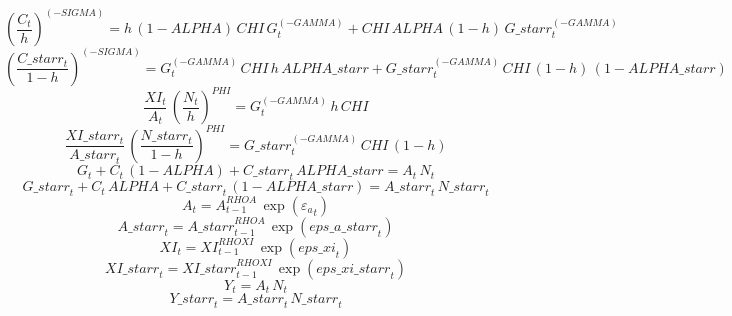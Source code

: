 \begin{dmath}
\left(\frac{{C}_{t}}{{h}}\right)^{\left(-{SIGMA}\right)}={h}\, \left(1-{ALPHA}\right)\, {CHI}\, {G}_{t}^{\left(-{GAMMA}\right)}+{CHI}\, {ALPHA}\, \left(1-{h}\right)\, {G\_starr}_{t}^{\left(-{GAMMA}\right)}
\end{dmath}
\begin{dmath}
\left(\frac{{C\_starr}_{t}}{1-{h}}\right)^{\left(-{SIGMA}\right)}={G}_{t}^{\left(-{GAMMA}\right)}\, {CHI}\, {h}\, {ALPHA\_starr}+{G\_starr}_{t}^{\left(-{GAMMA}\right)}\, {CHI}\, \left(1-{h}\right)\, \left(1-{ALPHA\_starr}\right)
\end{dmath}
\begin{dmath}
\frac{{XI}_{t}}{{A}_{t}}\, \left(\frac{{N}_{t}}{{h}}\right)^{{PHI}}={G}_{t}^{\left(-{GAMMA}\right)}\, {h}\, {CHI}
\end{dmath}
\begin{dmath}
\frac{{XI\_starr}_{t}}{{A\_starr}_{t}}\, \left(\frac{{N\_starr}_{t}}{1-{h}}\right)^{{PHI}}={G\_starr}_{t}^{\left(-{GAMMA}\right)}\, {CHI}\, \left(1-{h}\right)
\end{dmath}
\begin{dmath}
{G}_{t}+{C}_{t}\, \left(1-{ALPHA}\right)+{C\_starr}_{t}\, {ALPHA\_starr}={A}_{t}\, {N}_{t}
\end{dmath}
\begin{dmath}
{G\_starr}_{t}+{C}_{t}\, {ALPHA}+{C\_starr}_{t}\, \left(1-{ALPHA\_starr}\right)={A\_starr}_{t}\, {N\_starr}_{t}
\end{dmath}
\begin{dmath}
{A}_{t}={A}_{t-1}^{{RHOA}}\, \exp\left({{\varepsilon_a}}_{t}\right)
\end{dmath}
\begin{dmath}
{A\_starr}_{t}={A\_starr}_{t-1}^{{RHOA}}\, \exp\left({eps\_a\_starr}_{t}\right)
\end{dmath}
\begin{dmath}
{XI}_{t}={XI}_{t-1}^{{RHOXI}}\, \exp\left({eps\_xi}_{t}\right)
\end{dmath}
\begin{dmath}
{XI\_starr}_{t}={XI\_starr}_{t-1}^{{RHOXI}}\, \exp\left({eps\_xi\_starr}_{t}\right)
\end{dmath}
\begin{dmath}
{Y}_{t}={A}_{t}\, {N}_{t}
\end{dmath}
\begin{dmath}
{Y\_starr}_{t}={A\_starr}_{t}\, {N\_starr}_{t}
\end{dmath}
